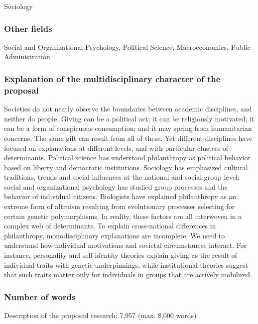 \documentclass[twocolumn, serif, rga, numeric]{jote-article}
\begin{document}
Sociology 
 {}\subsubsection*{Other fields} 

Social and Organizational Psychology, Political Science, Macroeconomics, Public Administration 
 {}\subsubsection*{Explanation of the multidisciplinary character of the proposal} 

Societies do not neatly observe the boundaries between academic disciplines, and neither do people. Giving can be a political act; it can be religiously motivated; it can be a form of conspicuous consumption; and it may spring from humanitarian concerns. The same gift can result from all of these. Yet different disciplines have focused on explanations at different levels, and with particular clusters of determinants. Political science has understood philanthropy as political behavior based on liberty and democratic institutions. Sociology has emphasized cultural traditions, trends and social influences at the national and social group level; social and organizational psychology has studied group processes and the behavior of individual citizens.
Biologists have explained philanthropy as an extreme form of altruism resulting from evolutionary processes selecting for certain genetic polymorphisms. In reality, these factors are all interwoven in a complex web of determinants. To explain cross-national differences in philanthropy, monodisciplinary explanations are incomplete. We need to understand how individual motivations and societal circumstances interact. For instance, personality and self-identity theories explain giving as the result of individual traits with genetic underpinnings, while institutional theories suggest that such traits matter only for individuals in groups that are actively mobilized.

\subsubsection*{Number of words}

Description of the proposed research: 7,957 (max. 8,000 words)
\end{document}
